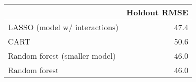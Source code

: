 
\begin{tabular}{lr}
\toprule
  & Holdout RMSE\\
\midrule
LASSO (model w/ interactions) & 47.4\\
CART & 50.6\\
Random forest (smaller model) & 46.0\\
Random forest & 46.0\\
\bottomrule
\end{tabular}